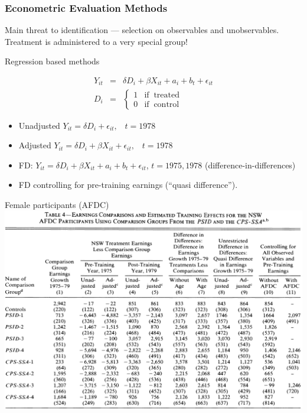 \documentclass[notes=show,beamer,compress]{beamer}
\begin{document}
\begin{frame}
\frametitle{Econometric Evaluation Methods}
Main threat to identification --- selection on observables and unobservables. Treatment is administered to a very special group!

Regression based methods

\begin{eqnarray*}
	Y_{it}&=& \delta D_i + \beta X_{it} + a_i + b_t + \epsilon_{it} \\
	D_i&=& \left\{ \begin{array}{cc}
                                                1 & \text{if}\;\; \text{treated} \\
                                                0& \text{if}\;\; \text{control}
                                                 \end{array} \right. 
\end{eqnarray*}
	
\begin {itemize}
\item Unadjusted $Y_{it}= \delta D_i +  \epsilon_{it}, \;\;\; t=1978$
\item Adjusted $Y_{it}= \delta D_i +  \beta X_{it}+  \epsilon_{it}, \;\;\; t=1978$
\item FD: $Y_{it}= \delta D_i + \beta X_{it} + a_i + b_t + \epsilon_{it}$,
$t=1975, 1978$ (difference-in-differences)
\item FD controlling for pre-training earnings (``quasi difference'').
\end{itemize}

\end{frame}

\begin{frame}{Female participants (AFDC)}
\includegraphics[width=1.0\linewidth]{graphs/lalonde86_4.png}
\end{frame}
\end{document}
